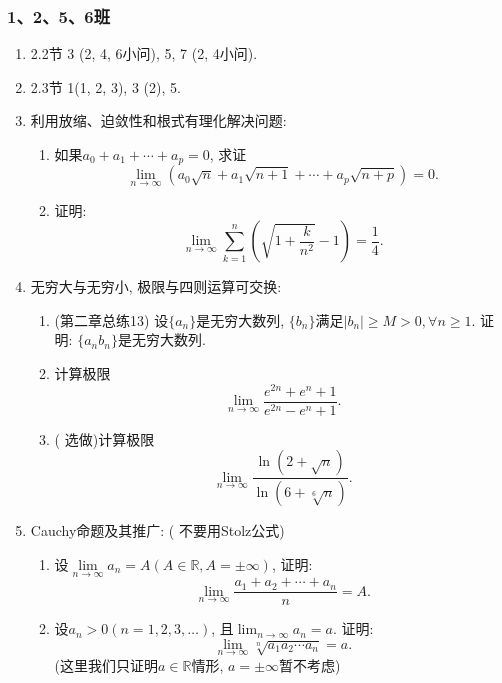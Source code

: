 \documentclass[UTF8,11pt, a4paper, oneside, fontset=none]{ctexbook}
\begin{document}
\subsubsection*{1、2、5、6班}
\begin{enumerate}

\item 2.2节 3 (2, 4, 6小问),  5, 7 (2, 4小问).

\item 2.3节 1(1, 2, 3), 3 (2), 5.

\item 利用放缩、迫敛性和根式有理化解决问题:

\begin{enumerate}

\item
如果$a_0 + a_1 + \cdots + a_p =0$, 求证
\[
\lim_{n \to \infty} (a_0 \sqrt n + a_1 \sqrt{n+1} + \cdots + a_p \sqrt{n+p})=0.
\]

\item 证明:
\[
\lim_{n \to \infty} \sum_{k=1}^n \left( \sqrt{1 + \frac{k}{n^2} } -1\right) = \frac{1}{4}.
\]

\end{enumerate}

\item 无穷大与无穷小, 极限与四则运算可交换:

\begin{enumerate}

\item (第二章总练13) 设$\{ a_n \}$是无穷大数列, $\{b_n \}$满足$|b_n| \geq M >0, \forall n \geq 1$. 证明: $\{ a_n b_n \}$是无穷大数列.

\item 计算极限
\[
\lim_{n \to \infty} \frac{e^{2n} + e^n + 1}{e^{2n} - e^n + 1}.
\]
\item ({\color{red} 选做})计算极限
\[
\lim_{n \to \infty} \frac{\ln (2 + \sqrt n)}{\ln(6 + \sqrt[6]{n})}.
\]

\end{enumerate}

\item Cauchy命题及其推广: ({\color{red} 不要用Stolz公式})

\begin{enumerate}

\item 设$\lim\limits_{n \to \infty}a_n =A ( A \in \mathbb R, A =  \pm\infty) $, 证明:
\[
\lim_{n \to \infty} \frac{a_1 + a_2 + \cdots + a_n}{n} = A.
\]
\item 设$a_n>0 (n = 1, 2, 3, \ldots)$, 且$\lim_{n \to \infty} a_n =a$. 证明:
\[
\lim_{n \to \infty} \sqrt[n]{a_1 a_2 \cdots a_n} = a.
\]
(这里我们只证明$a \in \mathbb R$情形, $a = \pm \infty$暂不考虑)


\end{enumerate}
\end{enumerate}
\end{document}
